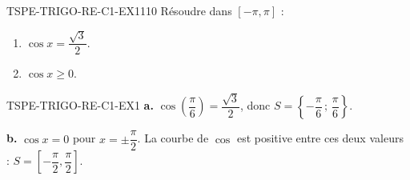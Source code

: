 

\begin{exercice}{TSPE-TRIGO-RE-C1-EX1}{1}{10}
Résoudre dans $[-\pi,\pi]$ :
\begin{enumerate}
  \item $\cos x = \dfrac{\sqrt{3}}{2}$.
  \item $\cos x \geq 0$.
\end{enumerate}
\end{exercice}


\begin{corrige}{TSPE-TRIGO-RE-C1-EX1}
\textbf{a.} $\cos\!\left(\dfrac{\pi}{6}\right) = \dfrac{\sqrt{3}}{2}$, donc $S = \left\{-\dfrac{\pi}{6}\,;\,\dfrac{\pi}{6}\right\}$.

\textbf{b.} $\cos x = 0$ pour $x = \pm\dfrac{\pi}{2}$. La courbe de $\cos$ est positive entre ces deux valeurs : $S = \left[-\dfrac{\pi}{2}, \dfrac{\pi}{2}\right]$.
\end{corrige}
